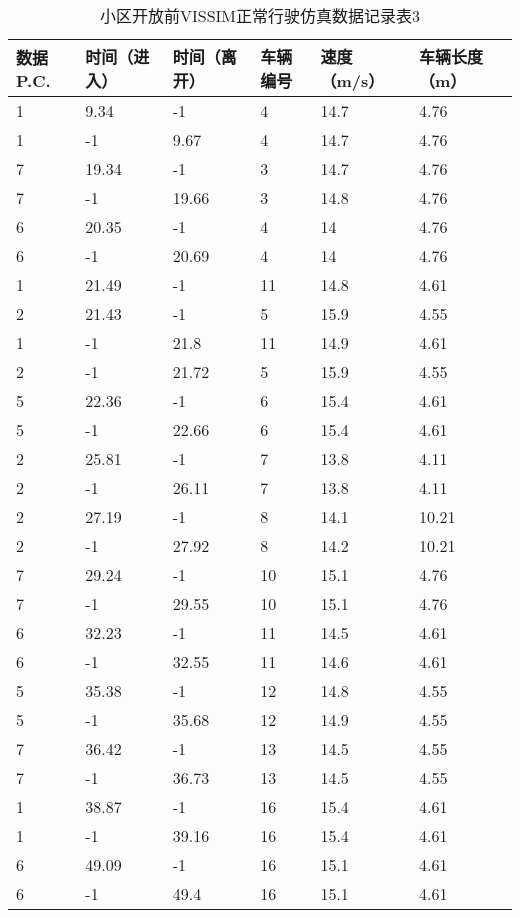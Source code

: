 \begin{table*}[h!]
  \centering
  \small
  \caption{小区开放前VISSIM正常行驶仿真数据记录表3}
\begin{tabular*}{\linewidth}{p{50pt}<{\centering}p{50pt}<{\centering}
p{60pt}<{\centering}p{60pt}<{\centering}p{60pt}<{\centering}p{70pt}<{\centering}}
\toprule
 数据P.C. & 时间（进入） & 时间（离开） & 车辆编号& 速度（m/s） & 车辆长度（m） \\
\midrule
1 & 9.34 & -1 & 4 & 14.7 & 4.76 \\
1 & -1 & 9.67 & 4 & 14.7 & 4.76 \\
7 & 19.34 & -1 & 3 & 14.7 & 4.76 \\
7 & -1 & 19.66 & 3 & 14.8 & 4.76 \\
6 & 20.35 & -1 & 4 & 14 & 4.76 \\
6 & -1 & 20.69 & 4 & 14 & 4.76 \\
1 & 21.49 & -1 & 11 & 14.8 & 4.61 \\
2 & 21.43 & -1 & 5 & 15.9 & 4.55 \\
1 & -1 & 21.8 & 11 & 14.9 & 4.61 \\
2 & -1 & 21.72 & 5 & 15.9 & 4.55 \\
5 & 22.36 & -1 & 6 & 15.4 & 4.61 \\
5 & -1 & 22.66 & 6 & 15.4 & 4.61 \\
2 & 25.81 & -1 & 7 & 13.8 & 4.11 \\
2 & -1 & 26.11 & 7 & 13.8 & 4.11 \\
2 & 27.19 & -1 & 8 & 14.1 & 10.21 \\
2 & -1 & 27.92 & 8 & 14.2 & 10.21 \\
7 & 29.24 & -1 & 10 & 15.1 & 4.76 \\
7 & -1 & 29.55 & 10 & 15.1 & 4.76 \\
6 & 32.23 & -1 & 11 & 14.5 & 4.61 \\
6 & -1 & 32.55 & 11 & 14.6 & 4.61 \\
5 & 35.38 & -1 & 12 & 14.8 & 4.55 \\
5 & -1 & 35.68 & 12 & 14.9 & 4.55 \\
7 & 36.42 & -1 & 13 & 14.5 & 4.55 \\
7 & -1 & 36.73 & 13 & 14.5 & 4.55 \\
1 & 38.87 & -1 & 16 & 15.4 & 4.61 \\
1 & -1 & 39.16 & 16 & 15.4 & 4.61 \\
6 & 49.09 & -1 & 16 & 15.1 & 4.61 \\
6 & -1 & 49.4 & 16 & 15.1 & 4.61 \\

\end{tabular*}
\end{table*}
